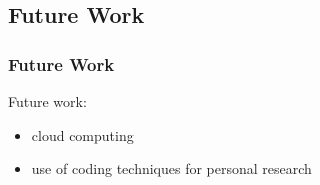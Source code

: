 \documentclass[usernames,dvipsnames]{beamer}
\begin{document}
\subsection{Future Work}

\begin{frame}	
	\frametitle{Future Work}
	
	\begin{block}{Future work:}
		\begin{itemize}
			\item cloud computing
			\item use of coding techniques for personal research
		\end{itemize}
	\end{block}
	
\end{frame}




 
\end{document}
